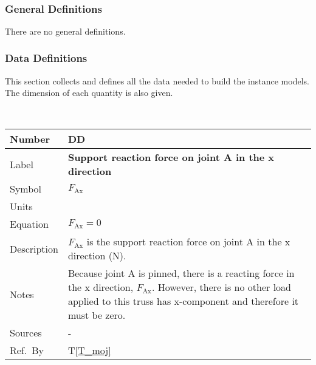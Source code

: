 \documentclass[12pt]{article}
\newcommand{\colAwidth}{0.13\textwidth}
\newcommand{\colBwidth}{0.82\textwidth}
\newcounter{defnum} %
\newcounter{datadefnum} %
\newcommand{\tref}[1]{T\ref{#1}}
\begin{document}
~\newline

\subsubsection{General Definitions}\label{sec_gendef}
There are no general definitions.

\subsubsection{Data Definitions}\label{sec_datadef}

This section collects and defines all the data needed to build the instance
models. The dimension of each quantity is also given.  

~\newline

\noindent
\begin{minipage}{\textwidth}
	\renewcommand*{\arraystretch}{1.5}
	\begin{tabular}{| p{\colAwidth} | p{\colBwidth}|}
		\hline
		\rowcolor[gray]{0.9}
		Number& DD{datadefnum}\thedatadefnum \label{D_forceAx}\\
		\hline
		Label& \bf Support reaction force on joint A in the x direction\\
		\hline
		Symbol &$F_{\text{Ax}}$\\
		\hline
		Units & \text{N} \\
		\hline
		Equation&$F_{\text{Ax}} = 0$\\
		\hline
		Description &$F_{\text{Ax}}$ is the support reaction force on joint A 
		in the x direction (N).\\
		\hline
		Notes &Because joint A is pinned, there is a reacting force in the x 
		direction, $F_{\text{Ax}}$. However, there is no other load applied to 
		this truss has x-component and therefore it must be zero.\\
		\hline
		Sources& -\\
		\hline
		Ref.\ By & \tref{T_moj}\\
		\hline
	\end{tabular}
\end{minipage}\\
\end{document}
